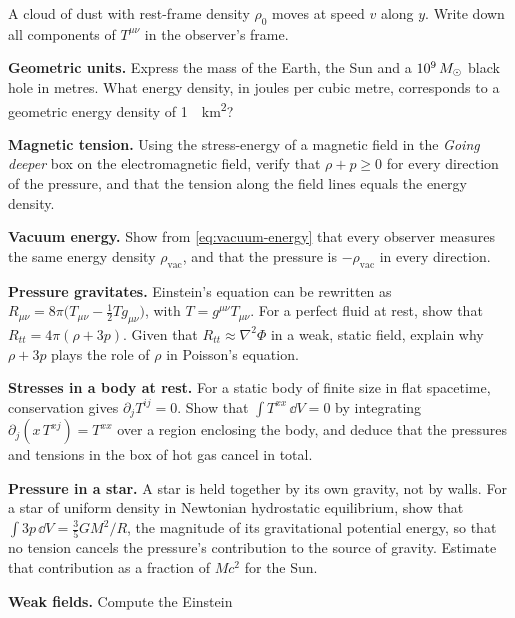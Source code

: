 \begin{problems}
\item {} A cloud of dust with rest-frame density $\rho_{0}$ moves at speed
  $v$ along $y$. Write down all components of $T^{\mu\nu}$ in the observer's
  frame.
\item {} \textbf{Geometric units.} Express the mass of the Earth, the Sun
  and a $10^{9}\,M_{\odot}$ black hole in metres. What energy density, in joules per
  cubic metre, corresponds to a geometric energy density of
  \SI{1}{\per\square\kilo\metre}?
\item {} \textbf{Magnetic tension.} Using the stress-energy of a magnetic
  field in the \emph{Going deeper} box on the electromagnetic field, verify
  that $\rho + p \ge 0$ for every direction of the pressure, and that the tension
  along the field lines equals the energy density.
\item {} \textbf{Vacuum energy.} Show from \cref{eq:vacuum-energy} that
  every observer measures the same energy density $\rho_{\text{vac}}$, and that
  the pressure is $-\rho_{\text{vac}}$ in every direction.
\item {}\label{prob:rho-3p} \textbf{Pressure gravitates.} Einstein's
  equation can be rewritten as
  $R_{\mu\nu} = 8\pi\bigl(T_{\mu\nu} - \tfrac12 T g_{\mu\nu}\bigr)$, with
  $T = g^{\mu\nu}T_{\mu\nu}$. For a perfect fluid at rest, show that
  $R_{tt} = 4\pi(\rho + 3p)$. Given that $R_{tt} \approx \nabla^{2}\Phi$ in a weak,
  static field, explain why $\rho + 3p$ plays the role of $\rho$ in Poisson's
  equation.
\item {}\label{prob:von-laue} \textbf{Stresses in a body at rest.} For a
  static body of finite size in flat spacetime, conservation gives
  $\partial_{j}T^{ij} = 0$. Show that $\int T^{xx}\,\dd V = 0$ by integrating
  $\partial_{j}(x\,T^{xj}) = T^{xx}$ over a region enclosing the body, and deduce
  that the pressures and tensions in the box of hot gas cancel in total.
\item {}\label{prob:star-pressure} \textbf{Pressure in a star.} A star is
  held together by its own gravity, not by walls. For a star of uniform
  density in Newtonian hydrostatic equilibrium, show that
  $\int 3p\,\dd V = \tfrac{3}{5}GM^{2}/R$, the magnitude of its gravitational
  potential energy, so that no tension cancels the pressure's contribution to
  the source of gravity. Estimate that contribution as a fraction of $Mc^{2}$
  for the Sun.
\item {}\label{prob:weak-field} \textbf{Weak fields.} Compute the Einstein

\end{problems}
